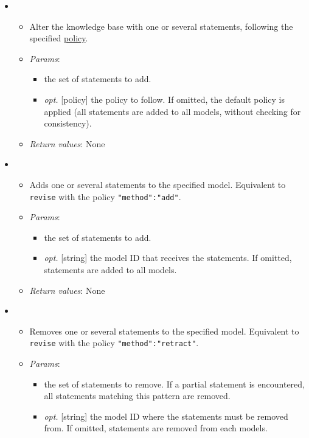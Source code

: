 \begin{itemize}
\item  {}
\begin{itemize}
\item  Alter the knowledge base with one or several statements, following the specified \hyperref[94422fa6b0fe23d0ab463703c0022a63]{policy}.
\item  \emph{Params}:
\begin{itemize}
\item  [set$<$statement$>$] the set of statements to add.
\item  \emph{opt.} [policy] the policy to follow. If omitted, the default policy is applied (all statements are added to all models, without checking for consistency). 
\end{itemize}

\item  \emph{Return values}: None
\end{itemize}

\item  {}
\begin{itemize}
\item  Adds one or several statements to the specified model. Equivalent to \texttt{revise} with the policy \texttt{{"method":"add"}}.
\item  \emph{Params}:
\begin{itemize}
\item  [set$<$statement$>$] the set of statements to add.
\item  \emph{opt.} [string] the model ID that receives the statements. If omitted, statements are added to all models. 
\end{itemize}

\item  \emph{Return values}: None
\end{itemize}

\item  {}
\begin{itemize}
\item  Removes one or several statements to the specified model. Equivalent to \texttt{revise} with the policy \texttt{{"method":"retract"}}.
\item  \emph{Params}:
\begin{itemize}
\item  [set$<$statement|partial{\textunderscore}statement$>$] the set of statements to remove. If a partial statement is encountered, all statements matching this pattern are removed.
\item  \emph{opt.} [string] the model ID where the statements must be removed from. If omitted, statements are removed from each models. 
\end{itemize}


\end{itemize}
\end{itemize}
